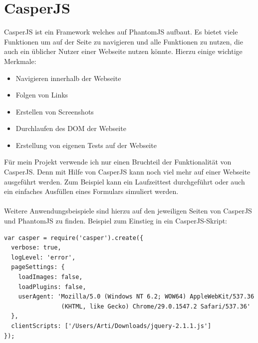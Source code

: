 \chapter{CasperJS}
CasperJS \cite{CasperJS} ist ein Framework welches auf PhantomJS \cite{Webkit} aufbaut.
Es bietet viele Funktionen um auf der Seite zu navigieren und alle Funktionen zu nutzen, die auch ein \"ublicher Nutzer einer Webseite nutzen k\"onnte.
Hierzu einige wichtige Merkmale:
\begin{itemize}
\item Navigieren innerhalb der Webseite
\item Folgen von Links
\item Erstellen von Screenshots 
\item Durchlaufen des DOM der Webseite
\item Erstellung von eigenen Tests auf der Webseite
\end{itemize}
F\"ur mein Projekt verwende ich nur einen Bruchteil der Funktionalit\"at von CasperJS. Denn mit Hilfe von CasperJS kann noch viel mehr auf einer Webseite ausgef\"uhrt werden.
Zum Beispiel kann ein Laufzeittest durchgef\"uhrt oder auch ein einfaches Ausf\"ullen eines Formulars simuliert werden.\\
\\
Weitere Anwendungsbeispiele sind hierzu auf den jeweiligen Seiten von CasperJS \cite{CasperJS} und PhantomJS\cite{Webkit} zu finden.
\newpage
Beispiel zum Einstieg in ein CasperJS-Skript:
\begin{lstlisting}
var casper = require('casper').create({
  verbose: true,
  logLevel: 'error',
  pageSettings: {
    loadImages: false,
    loadPlugins: false,
    userAgent: 'Mozilla/5.0 (Windows NT 6.2; WOW64) AppleWebKit/537.36 
    			(KHTML, like Gecko) Chrome/29.0.1547.2 Safari/537.36'
  },
  clientScripts: ['/Users/Arti/Downloads/jquery-2.1.1.js']
});
\end{lstlisting}


